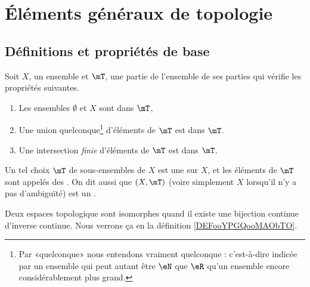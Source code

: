 
\section{Éléments généraux de topologie}

\subsection{Définitions et propriétés de base}

\begin{definition}		\label{DefTopologieGene}
Soit \( X \), un ensemble et \( \mT \), une partie de l'ensemble de ses parties qui vérifie les propriétés suivantes.
\begin{enumerate}
\item
  Les ensembles \( \emptyset \) et \( X \) sont dans \( \mT \),
\item
  Une union quelconque\footnote{Par «quelconque» nous entendons vraiment quelconque : c'est-à-dire indicée par un ensemble qui peut autant être \( \eN\) que \( \eR\) qu'un ensemble encore considérablement plus grand.} d'éléments de \( \mT\) est dans \( \mT\).
\item
  Une intersection \emph{finie} d'éléments de \( \mT\) est dans \( \mT\).
\end{enumerate}
Un tel choix \( \mT \) de sous-ensembles de \( X \) est une   sur \( X \), et les éléments de \( \mT \) sont appelés des . On dit aussi que \( (X,\mT) \) (voire simplement \( X \) lorsqu'il n'y a pas d'ambiguïté) est un .
\end{definition}

Deux espaces topologique sont isomorphes quand il existe une bijection continue d'inverse continue. Nous verrons ça en la définition \ref{DEFooYPGQooMAObTO}.



